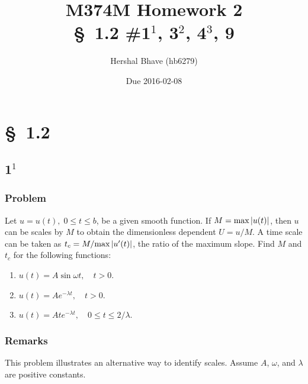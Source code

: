 \documentclass[12pt]{article}
\title{M374M Homework 2 \\
  \normalsize{\S~1.2 \#1$^1$, 3$^2$, 4$^3$, 9}}
\author{Hershal Bhave (hb6279)}
\date{Due 2016-02-08}
\begin{document}
\maketitle
\section{\S~1.2}
\subsection{1$^1$}
\subsubsection*{Problem}
Let $u=u(t),\;0 \le t \le b$, be a given smooth function. If
$M=\text{max}\left|{u(t)}\right|$, then $u$ can be scales by $M$ to obtain the
dimensionless dependent $U=u/M$. A time scale can be taken as
$t_c=M/\text{max}\left|{u'(t)}\right|$, the ratio of the maximum slope. Find $M$ and
$t_c$ for the following functions:
\begin{enumerate}
\item $u(t)=A\sin\omega t, \quad t>0$.
\item $u(t)=Ae^{-\lambda t},\quad t>0$.
\item $u(t)=Ate^{-\lambda t},\quad 0 \le t \le 2/\lambda.$
\end{enumerate}

\subsubsection*{Remarks}
This problem illustrates an alternative way to identify scales. Assume $A$,
$\omega$, and $\lambda$ are positive constants.
\end{document}
